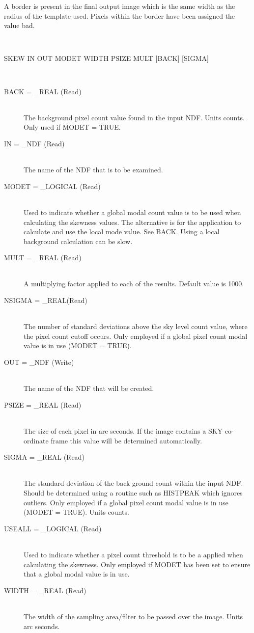 \documentclass[twoside,11pt]{article}
\newcommand{\LineBreak}{\hfill\break\hbox{}\qquad}
\newcommand{\sstusage}[1]{\item[Usage:] \mbox{}
\\[1.3ex]{\raggedright \ssttt #1}}
\newcommand{\sstparameters}[1]{
   \item[Parameters:] \mbox{} \\
   \vspace{-3.5ex}
   \begin{description}
      #1
   \end{description}
}
\newcommand{\sstsubsection}[1]{ \item[{#1}] \mbox{} \\}
\newcommand{\sstusage}[1]{\item[Usage:]
      \begin{description}
         {\ssttt #1}
      \end{description}
      \\
   }
\newcommand{\sstparameters}[1]{
      \item[Parameters:] \\
      \begin{description}
         #1
      \end{description}
      \\
   }
\newcommand{\sstsubsection}[1]{\item[{#1}]}
\begin{document}
{{      A border is present in the final output image which is the same
      width as the radius of the template used. Pixels within the
      border have been assigned the value bad.
   }
   \sstusage{
      SKEW IN OUT MODET WIDTH PSIZE MULT [BACK] [SIGMA]
\LineBreak
           [NSIGMA] [USEALL]
   }
   \sstparameters{
      \sstsubsection{
         BACK = \_REAL (Read)
      }{
         The background pixel count value found in the input NDF.
         Units counts. Only used if MODET = TRUE.
      }
      \sstsubsection{
         IN = \_NDF (Read)
      }{
         The name of the NDF that is to be examined.
      }
      \sstsubsection{
         MODET = \_LOGICAL (Read)
      }{
         Used to indicate whether a global modal count value
         is to be used when calculating the skewness values.
         The alternative is for the application to calculate and use the
         local mode value. See BACK. Using a local background
         calculation can be slow.
      }
      \sstsubsection{
         MULT = \_REAL (Read)
      }{
         A multiplying factor applied to each of the results.
         Default value is 1000.
      }
      \sstsubsection{
         NSIGMA = \_REAL(Read)
      }{
         The number of standard deviations above the sky level
         count value, where the pixel count cutoff occurs.
         Only employed if a global pixel count modal value is
         in use (MODET = TRUE).
      }
      \sstsubsection{
         OUT = \_NDF (Write)
      }{
         The name of the NDF that will be created.
      }
      \sstsubsection{
         PSIZE = \_REAL (Read)
      }{
         The size of each pixel in arc seconds.  If the image contains
         a SKY co-ordinate frame this value will be determined
         automatically.
      }
      \sstsubsection{
         SIGMA = \_REAL (Read)
      }{
         The standard deviation of the back ground count within the
         input NDF. Should be determined using a routine such as
         HISTPEAK which ignores outliers. Only employed if a global
         pixel count modal value is in use (MODET = TRUE).
         Units counts.
      }
      \sstsubsection{
         USEALL = \_LOGICAL (Read)
      }{
         Used to indicate whether a pixel count threshold is to
         be a applied when calculating the skewness.
         Only employed if MODET has been set to ensure that
         a global modal value is in use.
      }
      \sstsubsection{
         WIDTH = \_REAL (Read)
      }{
         The width of the sampling area/filter to be passed over the
         image. Units arc seconds.
      }
}}
\end{document}
